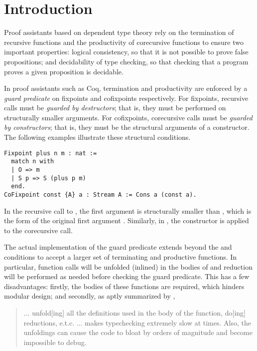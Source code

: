 \section{Introduction}\label{sec:intro}

Proof assistants based on dependent type theory rely on the termination of recursive functions and the productivity of corecursive functions to ensure two important properties: logical consistency, so that it is not possible to prove false propositions; and decidability of type checking, so that checking that a program proves a given proposition is decidable.

In proof assistants such as Coq, termination and productivity are enforced by a \emph{guard predicate} on fixpoints and cofixpoints respectively.
For fixpoints, recursive calls must be \emph{guarded by destructors}; that is, they must be performed on structurally smaller arguments.
For cofixpoints, corecursive calls must be \emph{guarded by constructors}; that is, they must be the structural arguments of a constructor.
The following examples illustrate these structural conditions.

\begin{verbatim}
Fixpoint plus n m : nat :=
  match n with
  | O => m
  | S p => S (plus p m)
  end.
CoFixpoint const {A} a : Stream A := Cons a (const a).
\end{verbatim}

In the recursive call to , the first argument  is structurally smaller than , which is the form of the original first argument . Similarly, in , the constructor  is applied to the corecursive call.

The actual implementation of the guard predicate extends beyond the \guardedbydestructors and \guardedbyconstructors conditions
to accept a larger set of terminating and productive functions.
In particular, function calls will be unfolded (\ie inlined) in the bodies of \cofixpoints
and reduction will be performed as needed before checking the guard predicate.
This has a few disadvantages:
firstly, the bodies of these functions are required, which hinders modular design;
and secondly, as aptly summarized by \citet{coqterm},

\begin{quote}
  ... unfold[ing] all the definitions used in the body of the function, do[ing] reductions, e.t.c.
  ... makes typechecking extremely slow at times.
  Also, the unfoldings can cause the code to bloat by orders of magnitude and become impossible to debug.
\end{quote}

